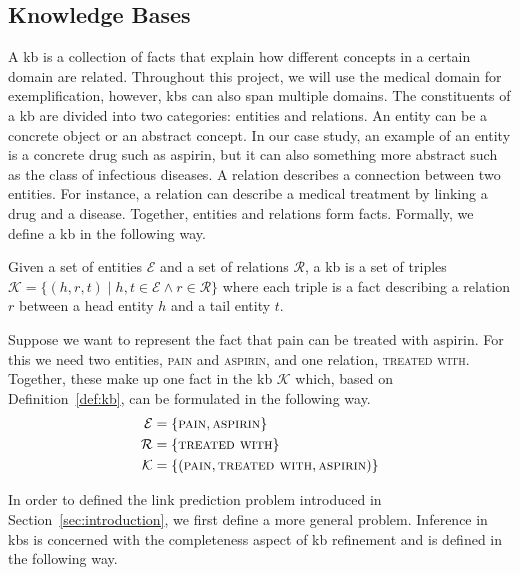 \subsection{Knowledge Bases}\label{sec:knowledge-bases}

A \acf{kb} is a collection of facts that explain how different concepts in a certain domain are related.
Throughout this project, we will use the medical domain for exemplification, however, \acp{kb} can also span multiple domains.
The constituents of a \ac{kb} are divided into two categories: entities and relations.
An entity can be a concrete object or an abstract concept.
In our case study, an example of an entity is a concrete drug such as aspirin, but it can also something more abstract such as the class of infectious diseases.
A relation describes a connection between two entities.
For instance, a relation can describe a medical treatment by linking a drug and a disease.
Together, entities and relations form facts.
Formally, we define a \ac{kb} in the following way.

\begin{definition}[\Acl{kb}]\label{def:kb}
  Given a set of entities $\mathcal{E}$ and a set of relations $\mathcal{R}$, a \acf{kb} is a set of triples $\mathcal{K} = \{(h, r, t) \mid h, t \in \mathcal{E} \wedge r \in \mathcal{R} \}$ where each triple is a fact describing a relation $r$ between a head entity $h$ and a tail entity $t$.
\end{definition}

\begin{example}\label{ex:kb}
  Suppose we want to represent the fact that pain can be treated with aspirin.
  For this we need two entities, \textsc{pain} and \textsc{aspirin}, and one relation, \textsc{treated with}.
  Together, these make up one fact in the \ac{kb} $\mathcal{K}$ which, based on Definition~\ref{def:kb}, can be formulated in the following way.
  \begin{align*}
    \mathcal{E} & = \{\textsc{pain}, \textsc{aspirin}\}                          \\
    \mathcal{R} & = \{\textsc{treated with}\}                                    \\
    \mathcal{K} & = \{(\textsc{pain}, \textsc{treated with}, \textsc{aspirin})\}
  \end{align*}
\end{example}

In order to defined the link prediction problem introduced in Section~\ref{sec:introduction}, we first define a more general problem.
Inference in \acp{kb} is concerned with the completeness aspect of \ac{kb} refinement and is defined in the following way.

